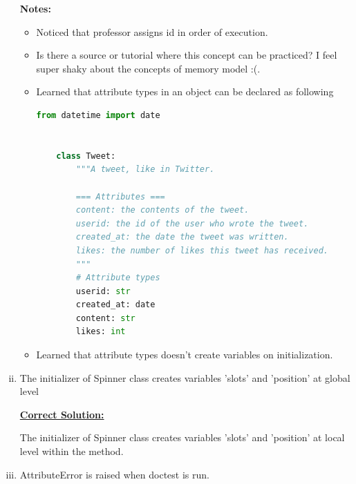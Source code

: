 \documentclass[12pt]{article}
\begin{document}
\begin{enumerate}[i.]
    \bigskip

    \textbf{Notes:}

    \begin{itemize}
    \item Noticed that professor assigns id in order of execution.
    \item Is there a source or tutorial where this concept can be practiced?
    I feel super shaky about the concepts of memory model :(.
    \item Learned that attribute types in an object can be declared as following

    \begin{lstlisting}[language=Python]
    from datetime import date


    class Tweet:
        """A tweet, like in Twitter.

        === Attributes ===
        content: the contents of the tweet.
        userid: the id of the user who wrote the tweet.
        created_at: the date the tweet was written.
        likes: the number of likes this tweet has received.
        """
        # Attribute types
        userid: str
        created_at: date
        content: str
        likes: int
    \end{lstlisting}

    \item Learned that attribute types doesn't create variables on initialization.
    \end{itemize}

    \item The initializer of Spinner class creates variables 'slots' and 'position' at
    global level

    \bigskip

    \begin{mdframed}
        \underline{\textbf{Correct Solution:}}

        \bigskip

        The initializer of Spinner class creates variables 'slots' and 'position' at
    \color{red}local level within the method\color{black}.
    \end{mdframed}

    \item AttributeError is raised when doctest is run.
\end{enumerate}
\end{document}
